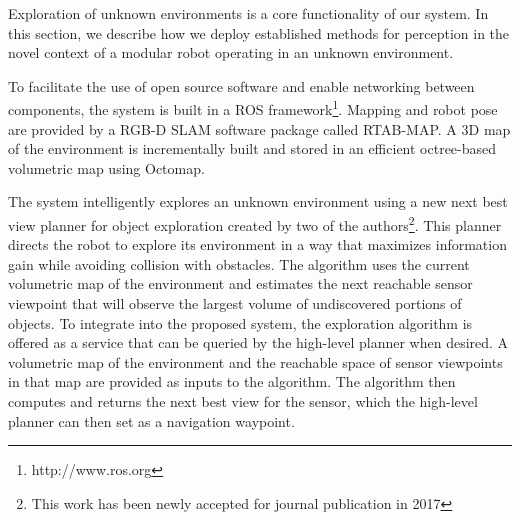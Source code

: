 \documentclass[conference]{IEEEtran}
\begin{document}

Exploration of unknown environments is a core functionality of our system. In this section, we describe how we deploy established methods for perception in the novel context of a modular robot operating in an unknown environment.

To facilitate the use of open source software and enable networking between components, the system is built in a ROS framework\footnote{http://www.ros.org}. Mapping and robot pose are provided by a RGB-D SLAM software package called RTAB-MAP\cite{rtabmap}. A 3D map of the environment is incrementally built and stored in an efficient octree-based volumetric map using Octomap\cite{octomap}.

The system intelligently explores an unknown environment using a new next best view planner for object exploration created by two of the authors\footnote{This work has been newly accepted for journal publication in 2017}. This planner directs the robot to explore its environment in a way that maximizes information gain while avoiding collision with obstacles. The algorithm uses the current volumetric map of the environment and estimates the next reachable sensor viewpoint that will observe the largest volume of undiscovered portions of objects. To integrate into the proposed system, the exploration algorithm is offered as a service that can be queried by the high-level planner when desired. A volumetric map of the environment and the reachable space of sensor viewpoints in that map are provided as inputs to the algorithm. The algorithm then computes and returns the next best view for the sensor, which the high-level planner can then set as a navigation waypoint.
\end{document}
